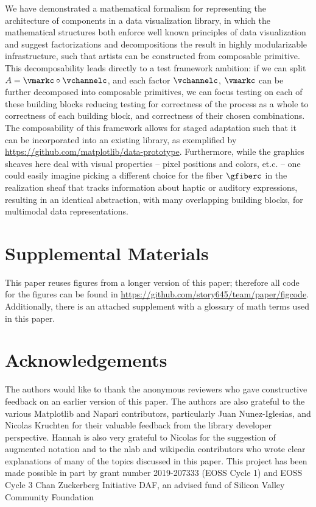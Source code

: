 \documentclass[preprint]{vgtc}
\begin{document}
We have demonstrated a mathematical formalism for representing the architecture of components in a data visualization library, in which the mathematical structures both enforce well known principles of data visualization and suggest factorizations and decompositions the result in highly modularizable infrastructure, such that artists can be constructed from composable primitive. This decomposability leads directly to a test framework ambition: if we can split $A=\vmarkc\circ\vchannelc$, and each factor $\vchannelc$, $\vmarkc$ can be further decomposed into composable primitives, we can focus testing on each of these building blocks reducing testing for correctness of the process as a whole to correctness of each building block, and correctness of their chosen combinations. The composability of this framework allows for staged adaptation such that it can be incorporated into an existing library, as exemplified by \url{https://github.com/matplotlib/data-prototype}. Furthermore, while the graphics sheaves here deal with visual properties -- pixel positions and colors, et.c. -- one could easily imagine picking a different choice for the fiber $\gfiberc$ in the realization sheaf that tracks information about haptic or auditory expressions, resulting in an identical abstraction, with many overlapping building blocks, for multimodal data representations.


\section*{Supplemental Materials}
\label{sec:supplemental_materials}
This paper reuses figures from a longer version of this paper; therefore all code for the figures can be found in \url{https://github.com/story645/team/paper/figcode}. Additionally, there is an attached supplement with a glossary of math terms used in this paper.

\section*{Acknowledgements}
The authors would like to thank the anonymous reviewers who gave constructive feedback on an earlier version of this paper. The authors are also grateful to  the various Matplotlib and Napari contributors, particularly Juan Nunez-Iglesias, and Nicolas Kruchten for their valuable feedback from the library developer perspective. Hannah is also very grateful to Nicolas for the suggestion of augmented notation and to the nlab and wikipedia contributors who wrote clear explanations of many of the topics discussed in this paper. This project has been made possible in part by grant number 2019-207333 (EOSS Cycle 1) and EOSS Cycle 3 Chan Zuckerberg Initiative DAF, an advised fund of Silicon Valley Community Foundation




\end{document}
